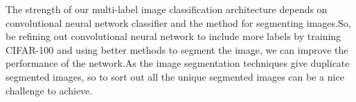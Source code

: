 The strength of our multi-label image classification architecture depends on convolutional neural network classifier and the method for segmenting images.So, be refining out convolutional neural network to include more labels by training CIFAR-100 and using better methods to segment the image, we can improve the performance of the network.As the image segmentation techniques give duplicate segmented images, so to sort out all the unique segmented images can be a nice challenge to achieve.